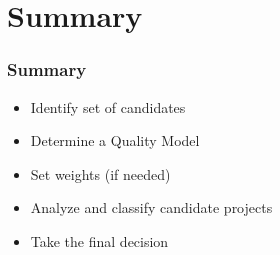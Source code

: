 \section{Summary}
\begin{frame}[allowframebreaks]
\frametitle{Summary}
\begin{itemize}\itemsep0pt
\item{Identify set of candidates}
\item{Determine a Quality Model}
\item{Set weights (if needed)}
\item{Analyze and classify candidate projects}
\item{Take the final decision}
\end{itemize}
\end{frame}
